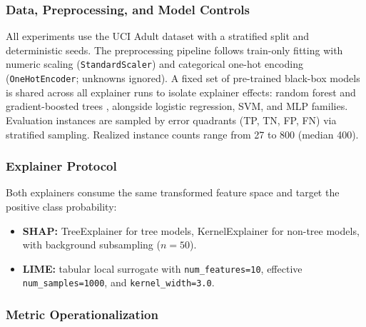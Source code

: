 \documentclass[fleqn,10pt,lineno]{wlpeerj}
\begin{document}
\subsubsection{Data, Preprocessing, and Model Controls}
\label{sec:data}

All experiments use the UCI Adult dataset \citep{kohavi1996scaling,becker1996adult} with
a stratified split and deterministic seeds. The preprocessing pipeline
follows train-only fitting with numeric scaling (\texttt{StandardScaler})
and categorical one-hot encoding (\texttt{OneHotEncoder};
unknowns ignored). A fixed set of pre-trained black-box models is shared across all
explainer runs to isolate explainer effects: random forest \citep{breiman2001random} and
gradient-boosted trees \citep{chen2016xgboost}, alongside logistic
regression, SVM, and MLP families. Evaluation instances are sampled by
error quadrants (TP, TN, FP, FN) via stratified sampling. Realized
instance counts range from 27 to 800 (median 400).

\subsubsection{Explainer Protocol}
\label{sec:explainer_protocol}

Both explainers consume the same transformed feature space and target the
positive class probability:
\begin{itemize}[leftmargin=*]
\item \textbf{SHAP:} TreeExplainer for tree models, KernelExplainer for
non-tree models, with background subsampling ($n=50$).
\item \textbf{LIME:} tabular local surrogate with
\texttt{num\_features=10}, effective \texttt{num\_samples=1000}, and
\texttt{kernel\_width=3.0}.
\end{itemize}

\subsubsection{Metric Operationalization}
\label{sec:metrics}
\end{document}
